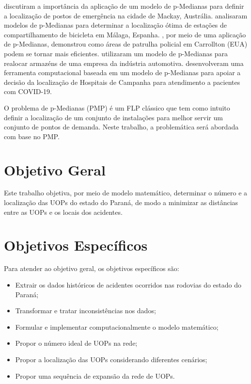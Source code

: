 \textcite{Dzator2017} discutiram a importância da aplicação de um modelo de p-Medianas para definir a localização de postos de emergência na cidade de Mackay, Austrália. \textcite{Cintrano2018} analisaram modelos de p-Medianas para determinar a localização ótima de estações de compartilhamento de bicicleta em Málaga, Espanha. \textcite{Wheeler2019}, por meio de uma aplicação de p-Medianas, demonstrou como áreas de patrulha policial em Carrollton (EUA) podem se tornar mais eficientes. \textcite{Zapata2020} utilizaram um modelo de p-Medianas para realocar armazéns de uma empresa da indústria automotiva. \textcite{Soares2021} desenvolveram uma ferramenta computacional baseada em um modelo de p-Medianas para apoiar a decisão da localização de Hospitais de Campanha para atendimento a pacientes com COVID-19. 

O problema de p-Medianas (PMP) é um FLP clássico que tem como intuito definir a localização de um conjunto de instalações para melhor servir um conjunto de pontos de demanda. Neste trabalho, a problemática será abordada com base no PMP.


\section{Objetivo Geral}

Este trabalho objetiva, por meio de modelo matemático, determinar o número e a localização das UOPs do estado do Paraná, de modo a minimizar as distâncias entre as UOPs e os locais dos acidentes.

\section{Objetivos Específicos}

Para atender ao objetivo geral, os objetivos específicos são:

\begin{itemize}
    \item Extrair os dados históricos de acidentes ocorridos nas rodovias do estado do Paraná;
    \item Transformar e tratar inconsistências nos dados;
    \item Formular e implementar computacionalmente o modelo matemático;
    \item Propor o número ideal de UOPs na rede;
    \item Propor a localização das UOPs considerando diferentes cenários;
    \item Propor uma sequência de expansão da rede de UOPs.
\end{itemize}

